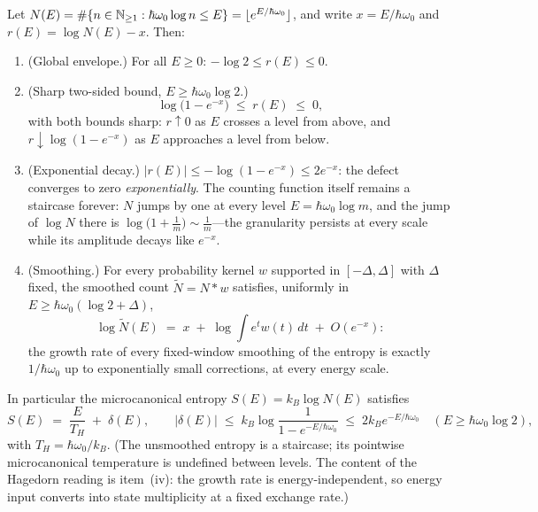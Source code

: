 \begin{theorem}\label{thm:logcount}
Let $N(E)=\#\{n\in\mathbb{N}_{\geq1}:\hbar\omega_{0}\log n\leq E\}=\lfloor e^{E/\hbar\omega_{0}}\rfloor$,
and write $x=E/\hbar\omega_{0}$ and $r(E)=\log N(E)-x$. Then:
\begin{enumerate}[leftmargin=1.6em]
\item (Global envelope.) For all $E\geq0$: $-\log2\leq r(E)\leq0$.
\item (Sharp two-sided bound, $E\geq\hbar\omega_{0}\log2$.)
\begin{equation}\label{eq:sharpdefect}
\log\bigl(1-e^{-x}\bigr)\;\leq\; r(E)\;\leq\; 0,
\end{equation}
with both bounds sharp: $r\uparrow0$ as $E$ crosses a level from above, and
$r\downarrow\log(1-e^{-x})$ as $E$ approaches a level from below.
\item (Exponential decay.) $|r(E)|\leq-\log(1-e^{-x})\leq 2e^{-x}$: the defect converges to
zero \emph{exponentially}. The counting function itself remains a staircase forever: $N$
jumps by one at every level $E=\hbar\omega_{0}\log m$, and the jump of $\log N$ there is
$\log\bigl(1+\tfrac1m\bigr)\sim\tfrac1m$---the granularity persists at every scale while its
amplitude decays like $e^{-x}$.
\item (Smoothing.) For every probability kernel $w$ supported in $[-\Delta,\Delta]$ with
$\Delta$ fixed, the smoothed count $\widetilde N=N\ast w$ satisfies, uniformly in
$E\geq\hbar\omega_{0}(\log2+\Delta)$,
\begin{equation}\label{eq:smoothing}
\log\widetilde N(E)\;=\;x\;+\;\log\!\int e^{t}w(t)\,dt\;+\;O(e^{-x}):
\end{equation}
the growth rate of every fixed-window smoothing of the entropy is exactly $1/\hbar\omega_{0}$
up to exponentially small corrections, at every energy scale.
\end{enumerate}
In particular the microcanonical entropy $S(E)=k_{B}\log N(E)$ satisfies
\begin{equation}
S(E)\;=\;\frac{E}{T_{H}}\;+\;\delta(E),
\qquad
|\delta(E)|\;\leq\;k_{B}\log\frac{1}{1-e^{-E/\hbar\omega_{0}}}\;\leq\;2k_{B}e^{-E/\hbar\omega_{0}}
\quad(E\geq\hbar\omega_{0}\log2),
\end{equation}
with $T_{H}=\hbar\omega_{0}/k_{B}$. (The unsmoothed entropy is a staircase; its pointwise
microcanonical temperature is undefined between levels. The content of the Hagedorn reading
is item~(iv): the growth rate is energy-independent, so energy input converts into state
multiplicity at a fixed exchange rate.)
\end{theorem}


